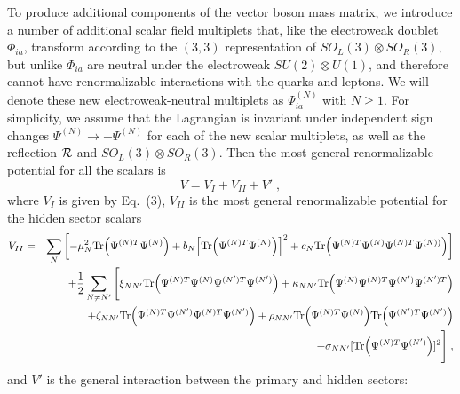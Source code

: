 To produce additional components of the vector boson mass matrix, we   introduce  a number of  additional scalar field multiplets   that, like the electroweak doublet $\Phi_{ia}$, transform according to the $(3,3)$ representation of $SO_L(3)\otimes  SO_R(3)$, but unlike $\Phi_{ia}$ are neutral under the electroweak $SU(2)\otimes U(1)$, and therefore cannot have renormalizable interactions with the quarks and leptons.  
We will denote   these new electroweak-neutral multiplets as $\Psi^{(N)}_{ia}$ with $N\geq 1$.  
For simplicity, we assume that the Lagrangian is invariant under independent sign changes $\Psi^{(N)}\rightarrow -\Psi^{(N)}$ for each of the new scalar multiplets, as well as the reflection ${\cal R}$ and $SO_L(3)\otimes  SO_R(3)$.  Then the most general renormalizable potential for all  the scalars is
\begin{equation}
V=V_I+V_{II}+V'\;,
\end{equation}
where $V_I$ is given by Eq.~(3), $V_{II}$ is the most general renormalizable potential for the hidden sector scalars
\begin{eqnarray}
V_{II}=&&\sum_N\left[-\mu_N^2{\rm Tr}\Big(\Psi^{(N)T}\Psi^{(N)}\Big)+b_N\Big[{\rm Tr}\Big(\Psi^{(N)T}\Psi^{(N)}\Big)\Big]^2+c_N{\rm Tr}\Big(\Psi^{(N)T}\Psi^{(N)}\Psi^{(N)T}\Psi^{(N))}\Big)\right]\nonumber\\&&
+\frac{1}{2}\sum_{N\neq N'}\Bigg[\xi_{NN'} {\rm Tr}\Big(\Psi^{(N)T}\Psi^{(N)}\Psi^{(N')T}\Psi^{(N')}\Big)+\kappa_{N N'}{\rm Tr}\Big(\Psi^{(N)}\Psi^{(N)T}\Psi^{(N')}\Psi^{(N')T}\Big)\nonumber\\&&
+\zeta_{N N'} {\rm Tr}\Big(\Psi^{(N)T}\Psi^{(N')}\Psi^{(N)T}\Psi^{(N')}\Big)
+\rho_{N N'} {\rm Tr}\Big(\Psi^{(N)T}\Psi^{(N)}\Big){\rm Tr}\Big(\Psi^{(N')T}\Psi^{(N')}\Big)\nonumber\\&&+\sigma_{N N'} [{\rm Tr}\Big(\Psi^{(N)T}\Psi^{(N')}\Big)]^2\Bigg]\;,
\end{eqnarray}
and $V'$ is  the general interaction between the primary and hidden sectors:
